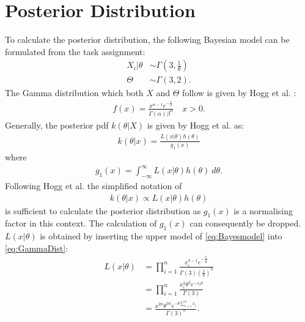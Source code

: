 \section{Posterior Distribution}
To calculate the posterior distribution, the following Bayesian model can be formulated from the task assignment:
\begin{equation}
\begin{split}
X_i|\theta &\sim \Gamma\left(3,\frac{1}{\theta}\right)\\
\Theta &\sim \Gamma(3,2).
\end{split}
\label{eq:Bayesmodel}
\end{equation}
The Gamma distribution which both $X$ and $\Theta$ follow is given by Hogg et al. \cite[Equation~3.3.2]{hogg}:
\begin{equation}
\begin{split}
f(x) = \frac{x^{\alpha-1}e^{-\frac{x}{\beta}}}{\Gamma(\alpha)\beta^\alpha}\quad x>0.
\end{split}
\label{eq:GammaDist}
\end{equation}
Generally, the posterior pdf $k(\theta|X)$ is given by Hogg et al. as: \cite[Equation~11.1.5]{hogg} 
\begin{equation}
\begin{split}
k(\theta|x) = \frac{L(x|\theta)h(\theta)}{g_1(x)}
\end{split}
\label{eq:Posterior}
\end{equation}
where 
\begin{equation}
\begin{split}
g_1(x) = \int_{-\infty}^\infty L(x|\theta)h(\theta) ~d\theta.
\end{split}
\label{eq:g_1}
\end{equation}
Following Hogg et al. \cite[Chapter 11.1.1]{hogg} the simplified notation of 
\begin{equation}
\begin{split}
k(\theta|x) \propto L(x|\theta)h(\theta)
\end{split}
\label{eq:Posterior2}
\end{equation}
is sufficient to calculate the posterior distribution as $g_1(x)$ is a normalising factor in this context. The calculation of $g_1(x)$ can consequently be dropped. $L(x|\theta)$ is obtained by inserting the upper model of \eqref{eq:Bayesmodel} into \eqref{eq:GammaDist}:
\begin{equation}
\begin{split}
L(x|\theta) 
&= \prod_{i=1}^n \frac{x_i^{3-1}e^{-\frac{x_i}{\frac{1}{\theta}}}}{\Gamma(3)\left(\frac{1}{\theta}\right)^3} \\
&= \prod_{i=1}^n \frac{x_i^{2}\theta^3e^{-x_i\theta}}{\Gamma(3)}\\
&= \frac{x^{2n}\theta^{3n}e^{-\theta\sum_{i=1}^nx_i}}{\Gamma(3)^n}.
\end{split}
\label{eq:bayeslikelyhood}
\end{equation}
